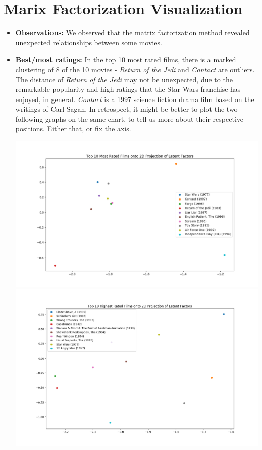 \section{Marix Factorization Visualization}
\medskip
\begin{itemize}
  \item \textbf{Observations:} We observed that the matrix factorization method revealed unexpected relationships between some movies. 
  \item \textbf{Best/most ratings:} In the top 10 most rated films, there is a marked clustering of 8 of the 10 movies - \textit{Return of the Jedi} and \textit{Contact} are outliers. The distance of \textit{Return of the Jedi} may not be unexpected, due to the remarkable popularity and high ratings that the Star Wars franchise has enjoyed, in general. \textit{Contact} is a 1997 science fiction drama film based on the writings of Carl Sagan. In retrospect, it might be better to plot the two following graphs on the same chart, to tell us more about their respective positions. Either that, or fix the axis. 
  \begin{center}
    \includegraphics[scale=.45]{mat_fac_2.png}
    \includegraphics[scale=.45]{mat_fac_3.png}

\end{center}
\end{itemize}

